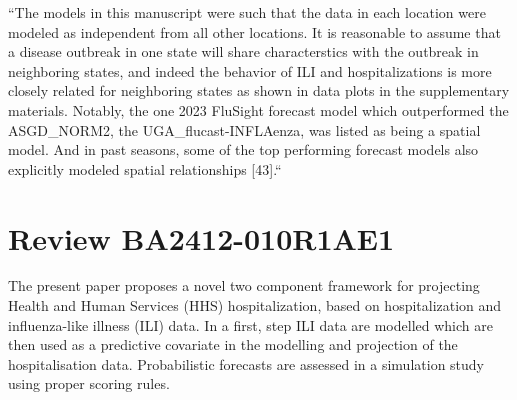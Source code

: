 \documentclass{article}
\begin{document}
\begin{enumerate}[1.]
{``The models in this manuscript were such that the data in each
location were modeled as
independent from all other locations. It is reasonable to assume that a
disease outbreak in one state will share characterstics with the outbreak in 
neighboring states, and indeed the behavior of ILI and hospitalizations is more
closely related for neighboring states as shown in data plots in the
supplementary materials. Notably, the one 2023 FluSight forecast model which 
outperformed
the ASGD\_NORM2, the UGA\_flucast-INFLAenza, was listed as being a spatial
model. And in past seasons, some of the top performing forecast models also 
explicitly modeled spatial relationships [43].``}

\end{enumerate}


\section*{Review BA2412-010R1AE1}

The present paper proposes a novel two component framework for projecting Health 
and Human Services (HHS) hospitalization, based on hospitalization and 
influenza-like illness (ILI) data. In a first, step ILI data are modelled which 
are then used as a predictive covariate in the modelling and projection of the 
hospitalisation data. Probabilistic forecasts are assessed in a simulation study 
using proper scoring rules.
\end{document}
